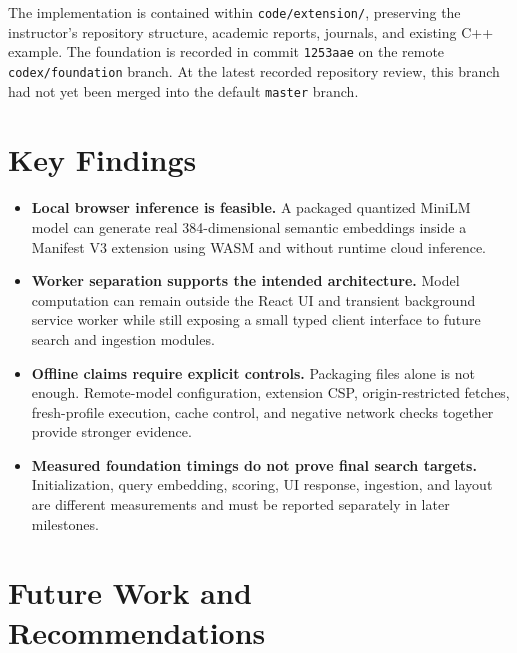 \documentclass{tietreport}
\begin{document}
The implementation is contained within \texttt{code/extension/}, preserving the instructor's
repository structure, academic reports, journals, and existing C++ example. The foundation
is recorded in commit \texttt{1253aae} on the remote \texttt{codex/foundation} branch. At the
latest recorded repository review, this branch had not yet been merged into the default
\texttt{master} branch.

\section{Key Findings}

\begin{itemize}
  \item \textbf{Local browser inference is feasible.} A packaged quantized MiniLM model can
    generate real 384-dimensional semantic embeddings inside a Manifest V3 extension using
    WASM and without runtime cloud inference.

  \item \textbf{Worker separation supports the intended architecture.} Model computation can
    remain outside the React UI and transient background service worker while still exposing
    a small typed client interface to future search and ingestion modules.

  \item \textbf{Offline claims require explicit controls.} Packaging files alone is not enough.
    Remote-model configuration, extension CSP, origin-restricted fetches, fresh-profile
    execution, cache control, and negative network checks together provide stronger evidence.

  \item \textbf{Measured foundation timings do not prove final search targets.} Initialization,
    query embedding, scoring, UI response, ingestion, and layout are different measurements
    and must be reported separately in later milestones.
\end{itemize}

\section{Future Work and Recommendations}
\end{document}
